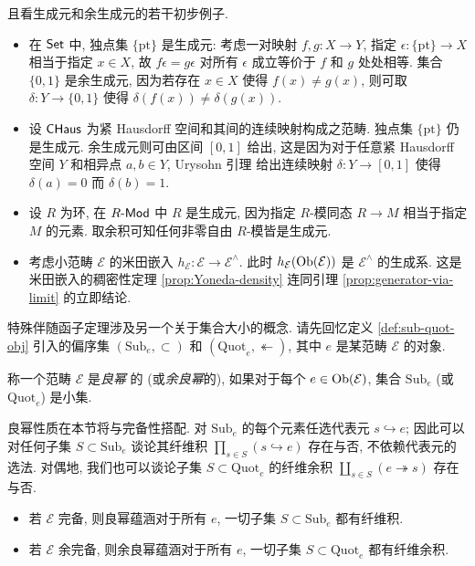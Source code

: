 \begin{example}\label{eg:generators}
	且看生成元和余生成元的若干初步例子.
	\begin{itemize}
		\item 在 $\mathsf{Set}$ 中, 独点集 $\{\mathrm{pt}\}$ 是生成元: 考虑一对映射 $f, g: X \to Y$, 指定 $\epsilon: \{\mathrm{pt}\} \to X$ 相当于指定 $x \in X$, 故 $f\epsilon = g\epsilon$ 对所有 $\epsilon$ 成立等价于 $f$ 和 $g$ 处处相等. 集合 $\{0,1\}$ 是余生成元, 因为若存在 $x \in X$ 使得 $f(x) \neq g(x)$, 则可取 $\delta: Y \to \{0,1\}$ 使得 $\delta(f(x)) \neq \delta(g(x))$.
		
		\item 设 $\mathsf{CHaus}$ 为紧 Hausdorff 空间和其间的连续映射构成之范畴. 独点集 $\{\mathrm{pt}\}$ 仍是生成元. 余生成元则可由区间 $[0, 1]$ 给出, 这是因为对于任意紧 Hausdorff 空间 $Y$ 和相异点 $a, b \in Y$, Urysohn 引理 \cite[定理 6.3.1 和推论 7.2.6]{Xiong} 给出连续映射 $\delta: Y \to [0,1]$ 使得 $\delta(a) = 0$ 而 $\delta(b) = 1$.
		
		\item 设 $R$ 为环, 在 $R\text{-}\mathsf{Mod}$ 中 $R$ 是生成元, 因为指定 $R$-模同态 $R \to M$ 相当于指定 $M$ 的元素. 取余积可知任何非零自由 $R$-模皆是生成元.
		
		\item 考虑小范畴 $\mathcal{E}$ 的米田嵌入 $h_{\mathcal{E}}: \mathcal{E} \to \mathcal{E}^\wedge$. 此时 $h_{\mathcal{E}}(\operatorname{Ob}(\mathcal{E}))$ 是 $\mathcal{E}^\wedge$ 的生成系. 这是米田嵌入的稠密性定理 \ref{prop:Yoneda-density} 连同引理 \ref{prop:generator-via-limit} 的立即结论.
	\end{itemize}
\end{example}

特殊伴随函子定理涉及另一个关于集合大小的概念. 请先回忆定义 \ref{def:sub-quot-obj} 引入的偏序集 $(\mathrm{Sub}_e, \subset)$ 和 $(\mathrm{Quot}_e, \twoheadleftarrow)$, 其中 $e$ 是某范畴 $\mathcal{E}$ 的对象.

\begin{definition}\label{def:well-powered}
	称一个范畴 $\mathcal{E}$ 是\emph{良幂} 的 (或\emph{余良幂}的), 如果对于每个 $e \in \operatorname{Ob}(\mathcal{E})$, 集合 $\mathrm{Sub}_e$ (或 $\mathrm{Quot}_e$) 是小集.
\end{definition}

良幂性质在本节将与完备性搭配. 对 $\mathrm{Sub}_e$ 的每个元素任选代表元 $s \hookrightarrow e$; 因此可以对任何子集 $S \subset \mathrm{Sub}_e$ 谈论其纤维积 $\prod_{s \in S} \left(s \hookrightarrow e \right)$ 存在与否, 不依赖代表元的选法. 对偶地, 我们也可以谈论子集 $S \subset \mathrm{Quot}_e$ 的纤维余积 $\coprod_{s \in S} \left(e \twoheadrightarrow s \right)$ 存在与否.
\begin{itemize}
	\item 若 $\mathcal{E}$ 完备, 则良幂蕴涵对于所有 $e$, 一切子集 $S \subset \mathrm{Sub}_e$ 都有纤维积.
	\item 若 $\mathcal{E}$ 余完备, 则余良幂蕴涵对于所有 $e$, 一切子集 $S \subset \mathrm{Quot}_e$ 都有纤维余积.
\end{itemize}

